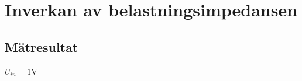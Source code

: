 


\section{Inverkan av belastningsimpedansen}\label{Zut}



\subsection{Mätresultat}\label{}

$U_{in} = 1 \si{\volt}$

